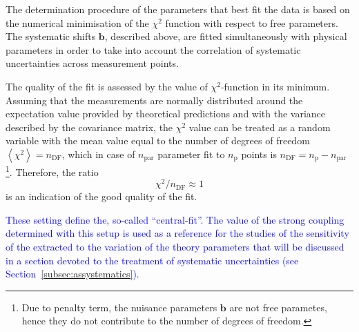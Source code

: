 The determination procedure of the parameters that best fit the data is based on the numerical minimisation of the $\chi^2$ function with respect to free parameters. The systematic shifts $\mathbf{b}$, described above, are fitted simultaneously with physical parameters in order to take into account the correlation of systematic uncertainties across measurement points.

The quality of the fit is assessed by the value of $\chi^2$-function in its minimum. Assuming that the measurements are normally distributed around the expectation value provided by theoretical predictions and with the variance described by the covariance matrix, the $\chi^2$ value can be treated as a random variable with the mean value equal to the number of degrees of freedom $\left\langle \chi^2 \right\rangle = n_\text{DF}$, which in case of $n_\text{par}$ parameter fit to $n_\text{p}$ points is $n_\text{DF}=n_\text{p}-n_\text{par}$\footnote{Due to penalty term, the nuisance parameters $\mathbf{b}$ are not free parametes, hence they do not contribute to the number of degrees of freedom.}. Therefore, the ratio
\begin{equation}
 \chi^2/n_\text{DF} \approx 1
\end{equation}
is an indication of the good quality of the fit.

\textcolor{blue}{These setting define the, so-called ``central-fit''. The value of the strong coupling determined with this setup is used as a reference for the studies of the sensitivity of the extracted \asz to the variation of the theory parameters that will be discussed in a section devoted to the treatment of systematic uncertainties (see Section~\ref{subsec:assystematics}).}
